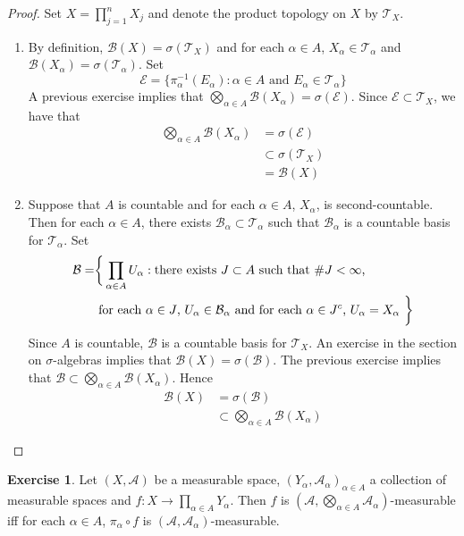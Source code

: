 \documentclass{book}
\theoremstyle{definition}
\newtheorem{ex}[definition]{Exercise}
\newcommand{\al}{\alpha}
\newcommand{\sig}{\sigma}
\newcommand{\MA}{\mathcal{A}}
\newcommand{\MB}{\mathcal{B}}
\newcommand{\ME}{\mathcal{E}}
\newcommand{\MT}{\mathcal{T}}
\newcommand{\lex}[1]{\label{ex:#1}}
\DeclareMathOperator*{\0}{\mbf{0}}
\DeclareMathOperator*{\1}{\mbf{1}}
\begin{document}
 	\begin{proof} Set $X = \prod_{j=1}^n X_j$ and denote the product topology on $X$ by $\MT_X$. 
 		\begin{enumerate}
 			\item By definition, $\MB(X) = \sig(\MT_X)$ and for each $\al \in A$, $X_{\al} \in \MT_{\al}$ and $\MB(X_{\al}) = \sig(\MT_{\al})$. Set 
 			$$\ME = \{\pi^{-1}_{\al}(E_{\al}): \al \in A \text{ and } E_{\al} \in \MT_{\al} \}$$ 
 			A previous exercise implies that $\bigotimes\limits_{\al \in A} \MB(X_{\al}) = \sig(\ME)$. Since $\ME \subset \MT_X$, we have that
 			\begin{align*}
 				\bigotimes_{\al \in A} \MB(X_{\al}) 
 				& = \sig(\ME) \\
 				& \subset \sig(\MT_X) \\
 				& = \MB(X)
 			\end{align*}
 			\item Suppose that $A$ is countable and for each $\al \in A$, $X_{\al}$, is second-countable. Then for each $\al \in A$, there exists $\MB_{\al} \subset \MT_{\al}$ such that $\MB_{\al}$ is a countable basis for $\MT_{\al}$. Set 
 			\begin{align*}
 				\MB = 
 				& \bigg \{\prod_{\al \in A} U_{\al}: \text{there exists $J \subset A$ such that $ \# J < \infty$, } \\
 				& \text{ for each $\al \in J$, $U_{\al} \in \MB_{\al}$ and for each $\al \in J^c$, $U_{\al} = X_{\al}$ } \bigg \}
 			\end{align*} 
 			Since $A$ is countable, $\MB$ is a countable basis for $\MT_X$. An exercise in the section on $\sig$-algebras implies that $\MB(X) = \sig(\MB)$. The previous exercise implies that $\MB \subset \bigotimes\limits_{\al \in A} \MB(X_{\al})$. Hence
 			\begin{align*}
 				\MB(X) 
 				& = \sig(\MB) \\
 				& \subset \bigotimes_{\al \in A} \MB(X_{\al}) 
 			\end{align*}
 		\end{enumerate}
 	\end{proof}
	
	\begin{ex} \lex{25006}
		Let $(X, \MA)$ be a measurable space, $(Y_{\al}, \MA_{\al})_{\al \in A}$ a collection of measurable spaces and $f: X \rightarrow \prod_{\al \in A}Y_{\al}$. Then $f$ is $(\MA, \bigotimes\limits_{\al \in A} \MA_{\al})$-measurable iff for each $\al \in A$, $\pi_{\al} \circ f$ is $(\MA, \MA_{\al})$-measurable.
	\end{ex}
	
\end{document}
